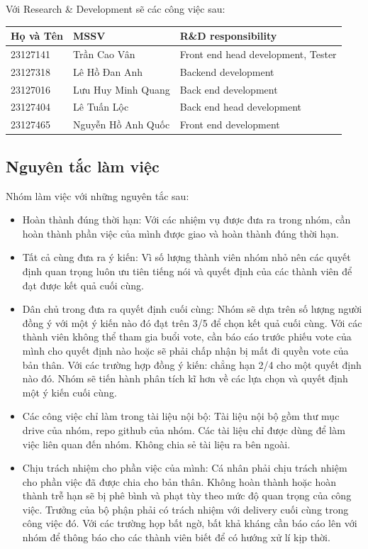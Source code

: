 \documentclass[12pt,a4paper]{article}
\begin{document}
Với Research \& Development sẽ các công việc sau:

\vspace{0.25cm}
\begin{tabular}{l l l}
\toprule
\textbf{Họ và Tên} & \textbf{MSSV} & \textbf{R\&D responsibility} \\
\midrule
23127141 & Trần Cao Vân & Front end head development, Tester \\
23127318 & Lê Hồ Đan Anh & Backend development \\
23127016 & Lưu Huy Minh Quang & Back end development \\
23127404 & Lê Tuấn Lộc & Back end head development \\
23127465 & Nguyễn Hồ Anh Quốc & Front end development\\
\bottomrule
\end{tabular}
\vspace{0.5cm}

\subsection{Nguyên tắc làm việc}
Nhóm làm việc với những nguyên tắc sau:
\begin{itemize}
    \item Hoàn thành đúng thời hạn: Với các nhiệm vụ được đưa ra trong nhóm, cần hoàn thành phần việc của mình được giao và hoàn thành đúng thời hạn.
    \item Tất cả cùng đưa ra ý kiến: Vì số lượng thành viên nhóm nhỏ nên các quyết định quan trọng luôn ưu tiên tiếng nói và quyết định của các thành viên để đạt được kết quả cuối cùng.
    \item Dân chủ trong đưa ra quyết định cuối cùng: Nhóm sẽ dựa trên số lượng người đồng ý với một ý kiến nào đó đạt trên 3/5 để chọn kết quả cuối cùng. Với các thành viên không thể tham gia buổi vote, cần báo cáo trước phiếu vote của mình cho quyết định nào hoặc sẽ phải chấp nhận bị mất đi quyền vote của bản thân. Với các trường hợp đồng ý kiến: chẳng hạn 2/4 cho một quyết định nào đó. Nhóm sẽ tiến hành phân tích kĩ hơn về các lựa chọn và quyết định một ý kiến cuối cùng.
    \item Các công việc chỉ làm trong tài liệu nội bộ: Tài liệu nội bộ gồm thư mục drive của nhóm, repo github của nhóm. Các tài liệu chỉ được dùng để làm việc liên quan đến nhóm. Không chia sẻ tài liệu ra bên ngoài.
    \item Chịu trách nhiệm cho phần việc của mình: Cá nhân phải chịu trách nhiệm cho phần việc đã được chia cho bản thân. Không hoàn thành hoặc hoàn thành trễ hạn sẽ bị phê bình và phạt tùy theo mức độ quan trọng của công việc. Trưởng của bộ phận phải có trách nhiệm với delivery cuối cùng trong công việc đó. Với các trường họp bất ngờ, bất khả kháng cần báo cáo lên với nhóm để thông báo cho các thành viên biết để có hướng xử lí kịp thời.
\end{itemize}
\end{document}
